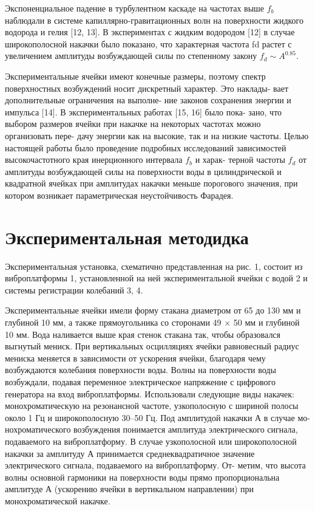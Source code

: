Экспоненциальное падение в турбулентном каскаде на частотах выше $f_b$ наблюдали в системе капиллярно-гравитационных волн на поверхности жидкого водорода и гелия [12, 13]. В экспериментах с жидким водородом [12] в случае широкополосной накачки было показано, что характерная частота fd растет с увеличением амплитуды возбуждающей силы по степенному закону $f_d \sim A^{0.85}$.

Экспериментальные ячейки имеют конечные размеры, поэтому спектр поверхностных возбуждений носит дискретный характер. Это наклады- вает дополнительные ограничения на выполне- ние законов сохранения энергии и импульса [14]. В экспериментальных работах [15, 16] было пока- зано, что выбором размеров ячейки при накачке на некоторых частотах можно организовать пере- дачу энергии как на высокие, так и на низкие частоты.
Целью настоящей работы было проведение подробных исследований зависимостей высокочастотного края инерционного интервала $f_b$ и харак- терной частоты $f_d$ от амплитуды возбуждающей силы на поверхности воды в цилиндрической и квадратной ячейках при амплитудах накачки меньше порогового значения, при котором возникает параметрическая неустойчивость Фарадея.



\section{Экспериментальная методидка} \label{sect2_1}

Экспериментальная установка, схематично представленная на рис. 1, состоит из виброплатформы 1, установленной на ней экспериментальной ячейки с водой 2 и системы регистрации колебаний 3, 4.

Экспериментальные ячейки имели форму стакана диаметром от 65 до 130 мм и глубиной 10 мм, а также прямоугольника со сторонами 49 $\times$ 50 мм и глубиной 10 мм. Вода наливается выше края стенок стакана так, чтобы образовался выгнутый мениск. При вертикальных осцилляциях ячейки равновесный радиус мениска меняется в зависимости от ускорения ячейки, благодаря чему возбуждаются колебания поверхности воды. Волны на поверхности воды возбуждали, подавая переменное электрическое напряжение с цифрового генератора на вход виброплатформы. Использовали следующие виды накачек: монохроматическую на резонансной частоте, узкополосную с шириной полосы около 1 Гц и широкополосную 30–50 Гц. Под амплитудой накачки А в случае мо- нохроматического возбуждения понимается амплитуда электрического сигнала, подаваемого на виброплатформу. В случае узкополосной или широкополосной накачки за амплитуду А принимается среднеквадратичное значение электрического сигнала, подаваемого на виброплатформу. От- метим, что высота волны основной гармоники на поверхности воды прямо пропорциональна амплитуде А (ускорению ячейки в вертикальном направлении) при монохроматической накачке.

